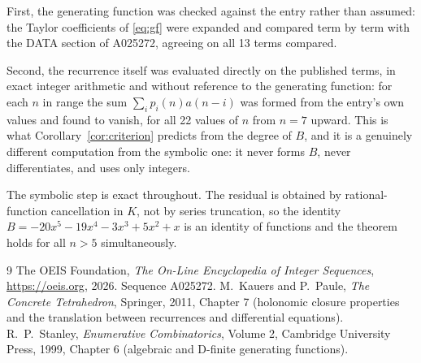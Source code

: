 \documentclass[11pt,a4paper]{article}
\theoremstyle{plain}
\theoremstyle{definition}
\begin{document}
First, the generating function was checked against the entry rather than assumed: the
Taylor coefficients of \eqref{eq:gf} were expanded and compared term by term with the DATA
section of A025272, agreeing on all 13 terms compared.

Second, the recurrence itself was evaluated directly on the published terms, in exact
integer arithmetic and without reference to the generating function: for each $n$ in range
the sum $\sum_{i}p_{i}(n)a(n-i)$ was formed from the entry's own values and found to
vanish, for all 22 values of $n$ from $n=7$ upward. This is what
Corollary~\ref{cor:criterion} predicts from the degree of $B$, and it is a genuinely
different computation from the symbolic one: it never forms $B$, never differentiates, and
uses only integers.

The symbolic step is exact throughout. The residual is obtained by rational-function
cancellation in $K$, not by series truncation, so the identity $B=- 20 x^{5} - 19 x^{4} - 3 x^{3} + 5 x^{2} + x$ is an
identity of functions and the theorem holds for all $n>5$ simultaneously.

\begin{thebibliography}{9}
 The OEIS Foundation, \emph{The On-Line Encyclopedia of Integer Sequences},
\url{https://oeis.org}, 2026. Sequence A025272.
 M.~Kauers and P.~Paule, \emph{The Concrete Tetrahedron}, Springer, 2011,
Chapter 7 (holonomic closure properties and the translation between recurrences and
differential equations).
 R.~P.~Stanley, \emph{Enumerative Combinatorics}, Volume 2, Cambridge
University Press, 1999, Chapter 6 (algebraic and D-finite generating functions).
\end{thebibliography}
\end{document}
